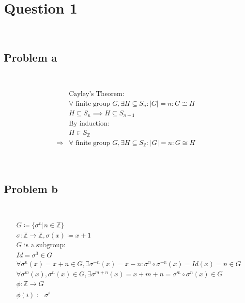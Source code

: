 \documentclass{article}
\begin{document}
\section*{Question 1}

~

\subsection*{Problem a}

~

\begin{equation*}
    \begin{split}
        &\text{Cayley's Theorem}:\\
        &\forall \text{ finite group }G,\exists H\subseteq S_n: |G|=n:G\cong H\\
        &H\subseteq S_n\implies H\subseteq S_{n+1}\\
        &\text{By induction}:\\
        &H\in S_\mathbb{Z} \\
        \Rightarrow&\forall \text{ finite group }G,\exists H\subseteq S_\mathbb{Z} : |G|=n:G\cong H\\
    \end{split}
\end{equation*}

~

\subsection*{Problem b}

~

\begin{equation*}
    \begin{split}
        &G\coloneqq \{\sigma^n|n\in\mathbb{Z}\}\\
        &\sigma:\mathbb{Z} \rightarrow\mathbb{Z} ,\sigma(x)\coloneqq x+1\\
        &G\text{ is a subgroup}:\\
        &Id=\sigma^0\in G \\
        &\forall \sigma^n(x)=x+n\in G,\exists \sigma^{-n}(x)=x-n:\sigma^n\circ \sigma^{-n}(x)=Id(x)=n\in G\\
        &\forall \sigma^m(x),\sigma^n(x)\in G,\exists \sigma^{m+n}(x)=x+m+n=\sigma^m\circ\sigma^n(x)\in G\\
        &\phi:\mathbb{Z} \rightarrow G\\
        &\phi(i)\coloneqq \sigma^i\\
    \end{split}
\end{equation*}
\end{document}
